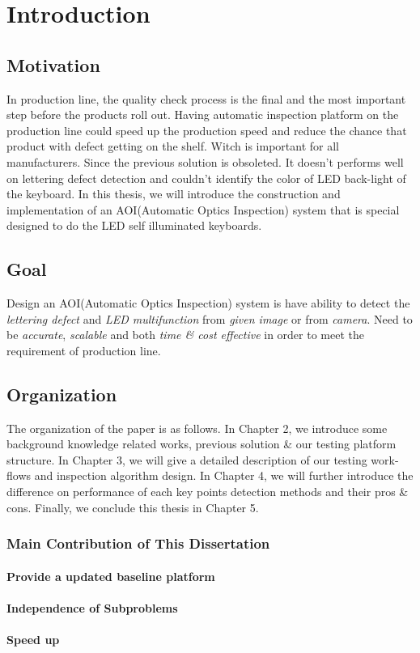 \chapter{Introduction}
\label{c:intro}

\section{Motivation}
\label{section:motivation}
In production line, the quality check process is the final and the most important step before the products roll out. 
Having automatic inspection platform on the production line could speed up the production speed and reduce the chance that product with defect getting on the shelf. Witch is important for all manufacturers.
Since the previous solution is obsoleted. It doesn't performs well on lettering defect detection and couldn't identify the color of LED back-light of the keyboard.
In this thesis, we will introduce the construction and implementation of an AOI(Automatic Optics Inspection) system that is special designed to do the LED self illuminated keyboards. 


\section{Goal}
\label{section:goal}
Design an AOI(Automatic Optics Inspection) system is have ability to detect the \emph{lettering defect} and \emph{LED multifunction} from \emph{given image} or from \emph{camera}.
Need to be \emph{accurate}, \emph{scalable} and both \emph{time \& cost effective} in order to meet the requirement of production line.

\section{Organization}
\label{section:organization}
The organization of the paper is as follows. 
In Chapter 2, we introduce some background knowledge related works, previous solution \& our testing platform structure.
In Chapter 3, we will give a detailed description of our testing work-flows and inspection algorithm design.
In Chapter 4, we will further introduce the difference on performance of each key points detection methods and their pros \& cons.
Finally, we conclude this thesis in Chapter 5.

\subsection{Main Contribution of This Dissertation}
\label{subsec:advantages}

\subsubsection{Provide a updated baseline platform}


\subsubsection{Independence of Subproblems}


\subsubsection{Speed up}
